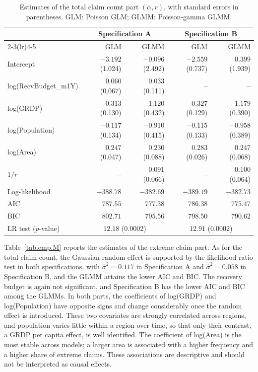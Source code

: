 \begin{table}[htbp]
\centering
\caption{Estimates of the total claim count part \((\alpha,r)\), with
standard errors in parentheses. GLM: Poisson GLM; GLMM: Poisson-gamma
GLMM.}
\label{tab.emp.N}
\small
\begin{tabular}{lrrrr}
\toprule
& \multicolumn{2}{c}{Specification A} & \multicolumn{2}{c}{Specification B}\\
\cmidrule(lr){2-3}\cmidrule(lr){4-5}
& GLM & GLMM & GLM & GLMM\\
\midrule
Intercept & \(-3.192\) (1.024) & \(-0.096\) (2.492) & \(-2.559\) (0.737) & \(0.399\) (1.939)\\
log(RecvBudget\_m1Y) & \(0.060\) (0.067) & \(0.033\) (0.111) & -- & --\\
log(GRDP) & \(0.313\) (0.130) & \(1.120\) (0.432) & \(0.327\) (0.129) & \(1.179\) (0.390)\\
log(Population) & \(-0.117\) (0.134) & \(-0.910\) (0.415) & \(-0.115\) (0.133) & \(-0.958\) (0.389)\\
log(Area) & \(0.247\) (0.047) & \(0.230\) (0.088) & \(0.283\) (0.026) & \(0.247\) (0.068)\\
\(1/r\) & -- & \(0.091\) (0.066) & -- & \(0.100\) (0.064)\\
\midrule
Log-likelihood & \(-388.78\) & \(-382.69\) & \(-389.19\) & \(-382.73\)\\
AIC & \(787.55\) & \(777.38\) & \(786.38\) & \(775.47\)\\
BIC & \(802.71\) & \(795.56\) & \(798.50\) & \(790.62\)\\
LR test (\(p\)-value) & \multicolumn{2}{c}{\(12.18\) (\(0.0002\))} & \multicolumn{2}{c}{\(12.91\) (\(0.0002\))}\\
\bottomrule
\end{tabular}
\end{table}

Table~\ref{tab.emp.M} reports the estimates of the extreme claim part.
As for the total claim count, the Gaussian random effect is supported
by the likelihood ratio test in both specifications, with
\(\widehat\sigma^2=0.117\) in Specification A and
\(\widehat\sigma^2=0.058\) in Specification B, and the GLMM attains the
lower AIC and BIC. The recovery budget is again not significant, and
Specification B has the lower AIC and BIC among the GLMMs. In both
parts, the coefficients of log(GRDP) and log(Population) have opposite
signs and change considerably once the random effect is introduced.
These two covariates are strongly correlated across regions, and
population varies little within a region over time, so that only their
contrast, a GRDP per capita effect, is well identified. The coefficient
of log(Area) is the most stable across models; a larger area is
associated with a higher frequency and a higher share of extreme claims.
These associations are descriptive and should not be interpreted as
causal effects.

